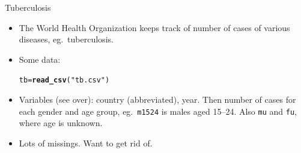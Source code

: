 \documentclass[unknownkeysallowed]{beamer}\usepackage[]{graphicx}\usepackage[]{color}
\makeatletter
\newcommand{\hlstr}[1]{\textcolor[rgb]{0.192,0.494,0.8}{#1}}%
\newcommand{\hlstd}[1]{\textcolor[rgb]{0.345,0.345,0.345}{#1}}%
\newcommand{\hlkwb}[1]{\textcolor[rgb]{0.69,0.353,0.396}{#1}}%
\newcommand{\hlkwd}[1]{\textcolor[rgb]{0.737,0.353,0.396}{\textbf{#1}}}%
\newenvironment{kframe}{%
 \def\at@end@of@kframe{}%
 \ifinner\ifhmode%
  \def\at@end@of@kframe{\end{minipage}}%
  \begin{minipage}{\columnwidth}%
 \fi\fi%
 \def\FrameCommand##1{\hskip\@totalleftmargin \hskip-\fboxsep
 \colorbox{shadecolor}{##1}\hskip-\fboxsep
     \hskip-\linewidth \hskip-\@totalleftmargin \hskip\columnwidth}%
 \MakeFramed {\advance\hsize-\width
   \@totalleftmargin\z@ \linewidth\hsize
   \@setminipage}}%
 {\par\unskip\endMakeFramed%
 \at@end@of@kframe}
\newenvironment{knitrout}{}{} %
\makeatother
\begin{document}
\begin{frame}[fragile]{Tuberculosis}
  
  \begin{itemize}
  \item The World Health Organization keeps track of number of cases
    of various diseases, eg.\ tuberculosis.
  \item Some data:
\begin{knitrout}
\color{fgcolor}\begin{kframe}
\begin{alltt}
  \hlstd{tb}\hlkwb{=}\hlkwd{read_csv}\hlstd{(}\hlstr{"tb.csv"}\hlstd{)}
\end{alltt}


{\ttfamily\noindent\itshape\color{messagecolor}{\#\# Parsed with column specification:\\\#\# cols(\\\#\#\ \  .default = col\_integer(),\\\#\#\ \  iso2 = col\_character()\\\#\# )}}

{\ttfamily\noindent\itshape\color{messagecolor}{\#\# See spec(...) for full column specifications.}}\end{kframe}
\end{knitrout}
\item Variables (see over): country (abbreviated), year. Then number of cases
  for each gender and age group, eg.\ \texttt{m1524} is males aged
  15--24. Also \texttt{mu} and \texttt{fu}, where age is unknown.
\item Lots of missings. Want to get rid of.
  \end{itemize}
  
\end{frame}
\end{document}
